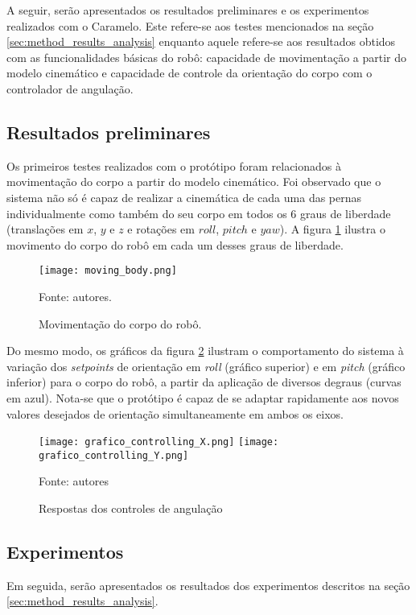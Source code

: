 \documentclass[../main.tex]{subfiles}
\begin{document}
  A seguir, serão apresentados os resultados preliminares e os experimentos realizados com o Caramelo. Este refere-se aos testes mencionados na seção \ref{sec:method_results_analysis} enquanto aquele refere-se aos resultados obtidos com as funcionalidades básicas do robô: capacidade de movimentação a partir do modelo cinemático e capacidade de controle da orientação do corpo com o controlador de angulação.
  
  \subsection{Resultados preliminares}

  Os primeiros testes realizados com o protótipo foram relacionados à movimentação do corpo a partir do modelo cinemático. Foi observado que o sistema não só é capaz de realizar a cinemática de cada uma das pernas individualmente como também do seu corpo em todos os 6 graus de liberdade (translações em $x$, $y$ e $z$ e rotações em $roll$, $pitch$ e $yaw$). A figura \ref{fig:moving_body} ilustra o movimento do corpo do robô em cada um desses graus de liberdade.

  \begin{figure}[h]
    \centering
    \caption{Movimentação do corpo do robô.}
    \texttt{[image: moving\_body.png]}
    
    Fonte: autores.
    \label{fig:moving_body}
  \end{figure}

  Do mesmo modo, os gráficos da figura \ref{fig:grafico_controlling} ilustram o comportamento do sistema à variação dos \textit{setpoints} de orientação em \textit{roll} (gráfico superior) e em \textit{pitch} (gráfico inferior) para o corpo do robô, a partir da aplicação de diversos degraus (curvas em azul). Nota-se que o protótipo é capaz de se adaptar rapidamente aos novos valores desejados de orientação simultaneamente em ambos os eixos.

  \begin{figure}[h]
    \centering
    \caption{Respostas dos controles de angulação}
    \texttt{[image: grafico\_controlling\_X.png]}
    \texttt{[image: grafico\_controlling\_Y.png]}
    
    Fonte: autores
    \label{fig:grafico_controlling}
  \end{figure}

  \subsection{Experimentos}
  Em seguida, serão apresentados os resultados dos experimentos descritos na seção \ref{sec:method_results_analysis}.
\end{document}
